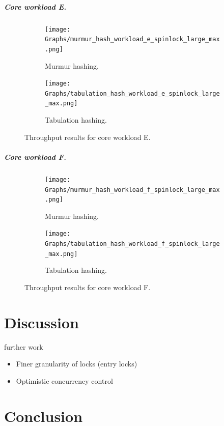 \documentclass[11pt]{article} %
\begin{document}
\subparagraph{Core workload E.} 
\begin{figure}[ht]
  \centering
  \begin{subfigure}[b]{0.45\textwidth}
    \texttt{[image: Graphs/murmur\_hash\_workload\_e\_spinlock\_large\_max.png]}
    \caption[]{Murmur hashing.}
    \label{fig:mur_e}
  \end{subfigure} \hfill
  \begin{subfigure}[b]{0.45\textwidth}
    \texttt{[image: Graphs/tabulation\_hash\_workload\_e\_spinlock\_large\_max.png]}
    \caption[]{Tabulation hashing.}
    \label{fig:tab_e}
  \end{subfigure}
  \caption[]{Throughput results for core workload E.}
  \label{fig:res_e}
\end{figure}


\subparagraph{Core workload F.} 
\begin{figure}[ht]
  \centering
  \begin{subfigure}[b]{0.45\textwidth}
    \texttt{[image: Graphs/murmur\_hash\_workload\_f\_spinlock\_large\_max.png]}
    \caption[]{Murmur hashing.}
    \label{fig:mur_f}
  \end{subfigure} \hfill
  \begin{subfigure}[b]{0.45\textwidth}
    \texttt{[image: Graphs/tabulation\_hash\_workload\_f\_spinlock\_large\_max.png]}
    \caption[]{Tabulation hashing.}
    \label{fig:tab_f}
  \end{subfigure}
  \caption[]{Throughput results for core workload F.}
  \label{fig:res_f}
\end{figure}


\newpage
\section{Discussion}
further work
\begin{itemize}
  \item Finer granularity of locks (entry locks)
  \item Optimistic concurrency control
\end{itemize}
\newpage
\section{Conclusion}
\newpage

\appendix
\end{document}
